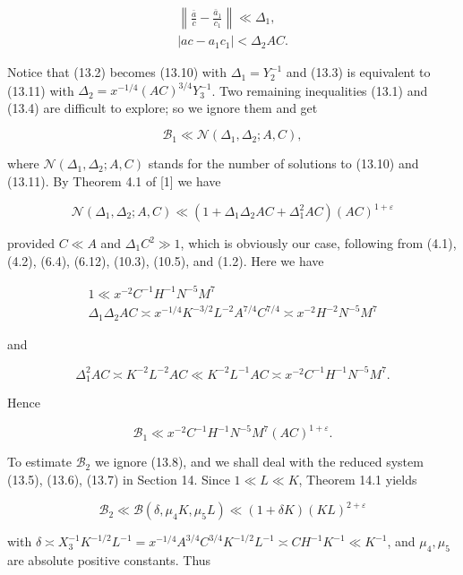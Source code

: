 \documentclass[10pt]{article}
\begin{document}
\begin{gather*}
\left\|\frac{\bar a}{c}-\frac{\bar a_{1}}{c_{1}}\right\|\ll\Delta_{1},  \tag{13.10}\\
\left|a c-a_{1} c_{1}\right|<\Delta_{2} A C . \tag{13.11}
\end{gather*}


Notice that (13.2) becomes (13.10) with $\Delta_{1}=Y_{2}^{-1}$ and (13.3) is equivalent to (13.11) with $\Delta_{2}=x^{-1 / 4}(A C)^{3 / 4} Y_{3}^{-1}$. Two remaining inequalities (13.1) and (13.4) are difficult to explore; so we ignore them and get

$$
\mathscr{B}_{1}\ll\mathcal{N}(\Delta_{1},\Delta_{2};A,C),
$$

where $\mathcal{N}(\Delta_{1},\Delta_{2};A,C)$ stands for the number of solutions to (13.10) and (13.11). By Theorem 4.1 of [1] we have

$$
\mathcal{N}\left(\Delta_{1}, \Delta_{2} ; A, C\right) \ll\left(1+\Delta_{1}\Delta_{2}AC+\Delta_{1}^{2}AC\right)(A C)^{1+\varepsilon}
$$

provided $C \ll A$ and $\Delta_{1} C^{2} \gg 1$, which is obviously our case, following from (4.1), (4.2), (6.4), (6.12), (10.3), (10.5), and (1.2). Here we have

$$
\begin{gathered}
1 \ll x^{-2} C^{-1} H^{-1} N^{-5} M^{7} \\
\Delta_{1}\Delta_{2}AC\asymp x^{-1 / 4} K^{-3 / 2} L^{-2} A^{7 / 4} C^{7 / 4} \asymp x^{-2} H^{-2} N^{-5} M^{7}
\end{gathered}
$$

and

$$
\Delta_{1}^{2}AC \asymp K^{-2} L^{-2} A C \ll K^{-2} L^{-1} A C \asymp x^{-2} C^{-1} H^{-1} N^{-5} M^{7} .
$$

Hence


\begin{equation*}
\mathscr{B}_{1} \ll x^{-2} C^{-1} H^{-1} N^{-5} M^{7}(A C)^{1+\varepsilon} . \tag{13.12}
\end{equation*}


To estimate $\mathscr{B}_{2}$ we ignore (13.8), and we shall deal with the reduced system (13.5), (13.6), (13.7) in Section 14. Since $1\ll L\ll K$, Theorem 14.1 yields

$$
\mathscr{B}_{2}\ll\mathscr{B}\left(\delta, \mu_{4} K, \mu_{5} L\right) \ll(1+\delta K)(K L)^{2+\varepsilon}
$$

with $\delta \asymp X_{3}^{-1} K^{-1 / 2} L^{-1}=x^{-1 / 4} A^{3 / 4} C^{3 / 4} K^{-1 / 2} L^{-1} \asymp C H^{-1} K^{-1} \ll K^{-1}$, and $\mu_{4}, \mu_{5}$ are absolute positive constants. Thus
\end{document}
